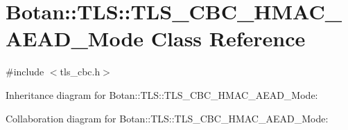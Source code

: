 \hypertarget{class_botan_1_1_t_l_s_1_1_t_l_s___c_b_c___h_m_a_c___a_e_a_d___mode}{}\section{Botan\+:\+:T\+LS\+:\+:T\+L\+S\+\_\+\+C\+B\+C\+\_\+\+H\+M\+A\+C\+\_\+\+A\+E\+A\+D\+\_\+\+Mode Class Reference}
\label{class_botan_1_1_t_l_s_1_1_t_l_s___c_b_c___h_m_a_c___a_e_a_d___mode}


{\ttfamily \#include $<$tls\+\_\+cbc.\+h$>$}



Inheritance diagram for Botan\+:\+:T\+LS\+:\+:T\+L\+S\+\_\+\+C\+B\+C\+\_\+\+H\+M\+A\+C\+\_\+\+A\+E\+A\+D\+\_\+\+Mode\+:


Collaboration diagram for Botan\+:\+:T\+LS\+:\+:T\+L\+S\+\_\+\+C\+B\+C\+\_\+\+H\+M\+A\+C\+\_\+\+A\+E\+A\+D\+\_\+\+Mode\+:
